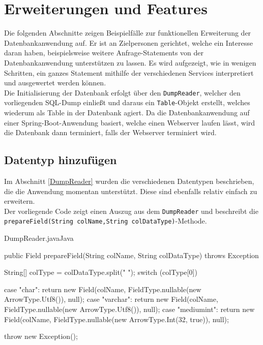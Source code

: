 \section{Erweiterungen und Features}
\label{erweitern}

Die folgenden Abschnitte zeigen Beispielfälle zur funktionellen Erweiterung der Datenbankanwendung auf. Er ist an Zielpersonen gerichtet, welche ein Interesse daran haben, beispielsweise weitere Anfrage-Statements von der Datenbankanwendung unterstützen zu lassen. Es wird aufgezeigt, wie in wenigen Schritten, ein ganzes Statement mithilfe der verschiedenen Services interpretiert und ausgewertet werden können.\\
Die Initialisierung der Datenbank erfolgt über den \texttt{DumpReader}, welcher den vorliegenden SQL-Dump einließt und daraus ein \texttt{Table}-Objekt erstellt, welches wiederum  als Table in der Datenbank agiert.
Da die Datenbankanwendung auf einer Spring-Boot-Anwendung basiert, welche einen Webserver laufen lässt, wird die Datenbank dann terminiert, falls der Webserver terminiert wird. 

\subsection{Datentyp hinzufügen}
Im Abschnitt \ref{DumpReader} wurden die verschiedenen Datentypen beschrieben, die die Anwendung momentan unterstützt. Diese sind ebenfalls relativ einfach zu erweitern.\\
Der vorliegende Code zeigt einen Auszug aus dem \texttt{DumpReader} und beschreibt die \texttt{prepareField(String colName,String colDataType)}-Methode.

\begin{codeblock}{DumpReader.java}{Java}
  \begin{javacode}
public Field prepareField(String colName, String colDataType) throws Exception {
        String[] colType = colDataType.split(" ");
        switch (colType[0]) {
            case "char":
                return new Field(colName, FieldType.nullable(new ArrowType.Utf8()), null);
            case "varchar":
                return new Field(colName, FieldType.nullable(new ArrowType.Utf8()), null);
            case "mediumint":
                return new Field(colName, FieldType.nullable(new ArrowType.Int(32, true)), null);

        }
        throw new Exception();
    }
  \end{javacode}
\end{codeblock}

